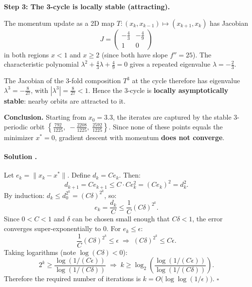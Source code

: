 \documentclass{article}
\newcounter{solutionCount}
\newcommand{\solution}[1]{
    \stepcounter{solutionCount}
    \paragraph{Solution \thesolutionCount.}
    {
        #1
    }
}
\begin{document}
{    \medskip
    \textbf{Step 3: The 3-cycle is locally stable (attracting).}

    The momentum update as a 2D map $T\colon (x_k, x_{k-1}) \mapsto (x_{k+1}, x_k)$ has Jacobian
    \[
    J = \begin{pmatrix} -\frac{4}{3} & -\frac{4}{9} \\ 1 & 0 \end{pmatrix}
    \]
    in both regions $x<1$ and $x\ge 2$ (since both have slope $f''=25$). The characteristic polynomial $\lambda^2 + \frac{4}{3}\lambda + \frac{4}{9} = 0$ gives a repeated eigenvalue $\lambda = -\frac{2}{3}$.

    The Jacobian of the 3-fold composition $T^3$ at the cycle therefore has eigenvalue $\lambda^3 = -\frac{8}{27}$, with $\left|\lambda^3\right| = \frac{8}{27} < 1$. Hence the 3-cycle is \textbf{locally asymptotically stable}: nearby orbits are attracted to it.

    \medskip
    \textbf{Conclusion.} Starting from $x_0 = 3.3$, the iterates are captured by the stable 3-periodic orbit $\left\{\frac{792}{1225},\; -\frac{2208}{1225},\; \frac{2592}{1225}\right\}$. Since none of these points equals the minimizer $x^* = 0$, gradient descent with momentum \textbf{does not converge}.
}

\solution{
    Let $e_k = \|x_k - x^*\|$. Define $d_k = C e_k$. Then:
    \[
    d_{k+1} = Ce_{k+1} \le C\cdot Ce_k^2 = (Ce_k)^2 = d_k^2.
    \]
    By induction: $d_k \le d_0^{2^k} = (C\delta)^{2^k}$, so:
    \[
    e_k = \frac{d_k}{C} \le \frac{1}{C}(C\delta)^{2^k}.
    \]
    Since $0 < C < 1$ and $\delta$ can be chosen small enough that $C\delta < 1$, the error converges super-exponentially to 0. For $e_k \le \epsilon$:
    \[
    \frac{1}{C}(C\delta)^{2^k} \le \epsilon \;\Longrightarrow\; (C\delta)^{2^k} \le C\epsilon.
    \]
    Taking logarithms (note $\log(C\delta)<0$):
    \[
    2^k \ge \frac{\log(1/(C\epsilon))}{\log(1/(C\delta))}
    \;\Longrightarrow\;
    k \ge \log_2\!\left(\frac{\log(1/(C\epsilon))}{\log(1/(C\delta))}\right).
    \]
    Therefore the required number of iterations is $k = O\!\big(\log\log(1/\epsilon)\big)$. \hfill$\square$
}
\end{document}
